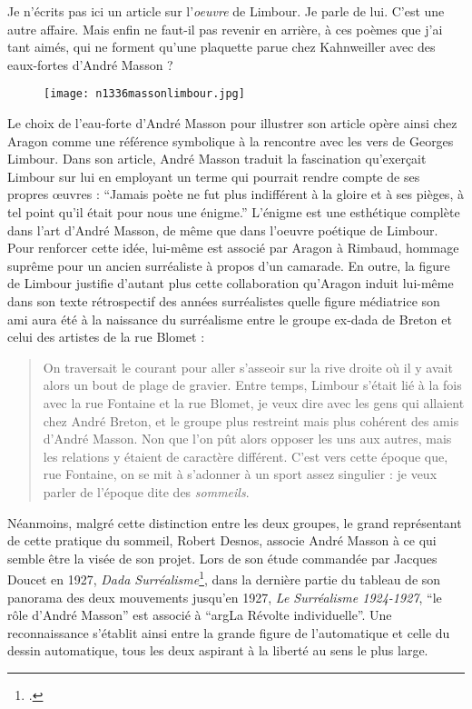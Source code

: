 Je n’écrits pas ici un article sur l’\emph{oeuvre} de Limbour. Je parle de lui. C’est une autre affaire. Mais enfin ne faut-il pas revenir en arrière, à ces poèmes que j’ai tant aimés, qui ne forment qu’une plaquette parue chez Kahnweiller avec des eaux-fortes d’André Masson ?

\begin{figure}[H]
   \centering
   \texttt{[image: n1336massonlimbour.jpg]}
	\caption{\cite{journallimbour}}\label{fig:limbour}
\end{figure}



	Le choix de l’eau-forte d’André Masson pour illustrer son article opère ainsi chez Aragon comme une référence symbolique à la rencontre avec les vers de Georges Limbour. Dans son article, André Masson traduit la fascination qu’exerçait Limbour sur lui en employant un terme qui pourrait rendre compte de ses propres œuvres : \enquote{Jamais poète ne fut plus indifférent à la gloire et à ses pièges, à tel point qu’il était pour nous une énigme.} L’énigme est une esthétique complète dans l’art d’André Masson, de même que dans l’oeuvre poétique de Limbour. Pour renforcer cette idée, lui-même est associé par Aragon à Rimbaud, hommage suprême pour un ancien surréaliste à propos d’un camarade. En outre, la figure de Limbour justifie d’autant plus cette collaboration qu’Aragon induit lui-même dans son texte rétrospectif des années surréalistes quelle figure médiatrice son ami aura été à la naissance du surréalisme entre le groupe ex-dada de Breton et celui des artistes de la rue Blomet : 

\begin{quote}
On traversait le courant pour aller s’asseoir sur la rive droite où il y avait alors un bout de plage de gravier. Entre temps, Limbour s’était lié à la fois avec la rue Fontaine et la rue Blomet, je veux dire avec les gens qui allaient chez André Breton, et le groupe plus restreint mais plus cohérent des amis d’André Masson. Non que l’on pût alors opposer les uns aux autres, mais les relations y étaient de caractère différent. C’est vers cette époque que, rue Fontaine, on se mit à s’adonner à un sport assez singulier : je veux parler de l’époque dite des \emph{sommeils}.	
\end{quote}


	Néanmoins, malgré cette distinction entre les deux groupes, le grand représentant de cette pratique du sommeil, Robert Desnos, associe André Masson à ce qui semble être la visée de son projet. Lors de son étude commandée par Jacques Doucet en 1927, \emph{Dada Surréalisme}\footcite[p152]{desnos}, dans la dernière partie du tableau de son panorama des deux mouvements jusqu’en 1927, \emph{Le Surréalisme 1924-1927}, \enquote{le rôle d’André Masson} est associé à \enquote{argLa Révolte individuelle}. Une reconnaissance s’établit ainsi entre la grande figure de l’automatique et celle du dessin automatique, tous les deux aspirant à la liberté au sens le plus large. 

